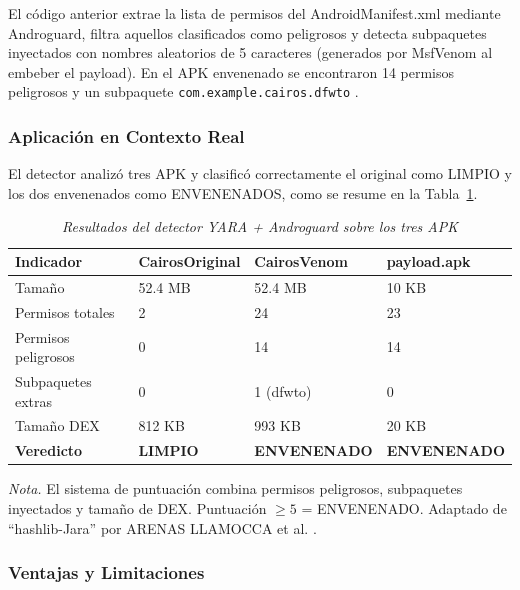 \documentclass[12pt,a4paper]{article}
\begin{document}
El código anterior extrae la lista de permisos del AndroidManifest.xml
mediante Androguard, filtra aquellos clasificados como peligrosos y
detecta subpaquetes inyectados con nombres aleatorios de 5 caracteres
(generados por MsfVenom al embeber el payload). En el APK envenenado se
encontraron 14 permisos peligrosos y un subpaquete
\texttt{com.example.cairos.dfwto} \cite{huacac2026}.

\subsubsection{Aplicación en Contexto Real}

El detector analizó tres APK y clasificó correctamente el original como
LIMPIO y los dos envenenados como ENVENENADOS, como se resume en la
Tabla~\ref{tab:resultados_deteccion}.

\begin{table}[H]
\centering\footnotesize
\begin{threeparttable}
\caption{\textit{Resultados del detector YARA + Androguard sobre los tres APK}}
\label{tab:resultados_deteccion}
\begin{tabular}{p{3.3cm}p{3.2cm}p{3.2cm}p{2.8cm}}
\toprule
\textbf{Indicador} & \textbf{CairosOriginal} & \textbf{CairosVenom} & \textbf{payload.apk} \\
\midrule
Tamaño & 52.4 MB & 52.4 MB & 10 KB \\
Permisos totales & 2 & 24 & 23 \\
Permisos peligrosos & 0 & 14 & 14 \\
Subpaquetes extras & 0 & 1 (dfwto) & 0 \\
Tamaño DEX & 812 KB & 993 KB & 20 KB \\
\textbf{Veredicto} & \textbf{LIMPIO} & \textbf{ENVENENADO} & \textbf{ENVENENADO} \\
\bottomrule
\end{tabular}
\begin{tablenotes}
\item \textit{Nota.} El sistema de puntuación combina permisos peligrosos, subpaquetes inyectados y tamaño de DEX. Puntuación $\geq 5$ = ENVENENADO. Adaptado de \enquote{hashlib-Jara} por ARENAS LLAMOCCA et al. \cite{huacac2026}.
\end{tablenotes}
\end{threeparttable}
\end{table}

\subsubsection{Ventajas y Limitaciones}
\end{document}
